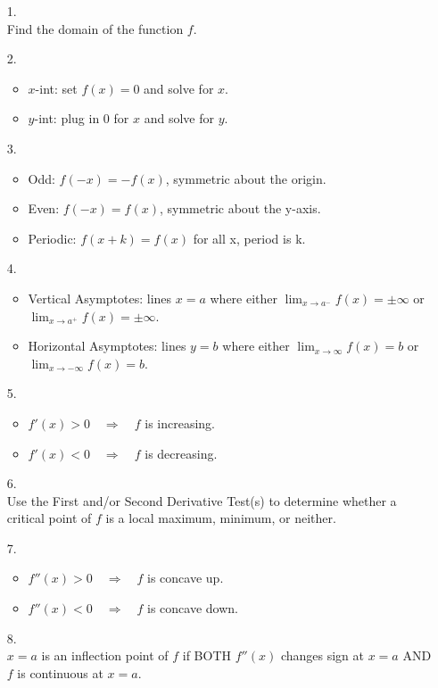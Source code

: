 \documentclass[nooutcomes]{ximera}
\begin{document}
\begin{enumerate}

\item[1.]    \\
	Find the domain of the function $f$.

\item[2.]  
	\begin{itemize}
		\item $x$-int: set $f(x)=0$ and solve for $x$.
		\item $y$-int: plug in 0 for $x$ and solve for $y$.
	\end{itemize}

\item[3.]   
	\begin{itemize}
		\item  Odd:  $f(-x)=-f(x)$, symmetric about the origin.
		\item  Even:  $f(-x)=f(x)$, symmetric about the y-axis.
		\item  Periodic:  $f(x+k)=f(x)$ for all x, period is k.
	\end{itemize}

\item[4.]   
	\begin{itemize}
		\item  Vertical Asymptotes:  lines $x=a$ where either $\lim_{x \to a^-} f(x) = \pm \infty$ or $\lim_{x \to a^+} f(x) = \pm \infty$.
		\item  Horizontal Asymptotes:  lines $y=b$ where either $\lim_{x \to \infty} f(x) = b $ or $\lim_{x \to -\infty} f(x) = b $.
	\end{itemize}
	
\item[5.]  
	\begin{itemize}
		\item  $f'(x) > 0 \quad \Longrightarrow \quad f$ is increasing.
		\item  $f'(x) < 0 \quad \Longrightarrow \quad f$ is decreasing.
	\end{itemize}
\item[6.]    \\
	Use the First and/or Second Derivative Test(s) to determine whether a critical point of $f$ is a local maximum, minimum, or neither.
	
\item[7.]  
	\begin{itemize}
		\item  $f''(x) > 0 \quad \Longrightarrow \quad f$ is concave up.
		\item  $f''(x) < 0 \quad \Longrightarrow \quad f$ is concave down.
	\end{itemize}

\item[8.]    \\
	$x=a$ is an inflection point of $f$ if BOTH $f''(x)$ changes sign at $x=a$ AND $f$ is continuous at $x=a$.

\end{enumerate}
\end{document}
